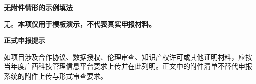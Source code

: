 \GXNSFBodyText

\noindent\textbf{无附件情形的示例填法}\par
无。\textbf{本项仅用于模板演示，不代表真实申报材料。}

\noindent\textbf{正式申报提示}\par
如项目涉及合作协议、数据授权、伦理审查、知识产权许可或其他证明材料，应按当年度广西科技管理信息平台要求上传并在此列明。正文中的附件清单不替代申报系统的附件上传与形式审查要求。
